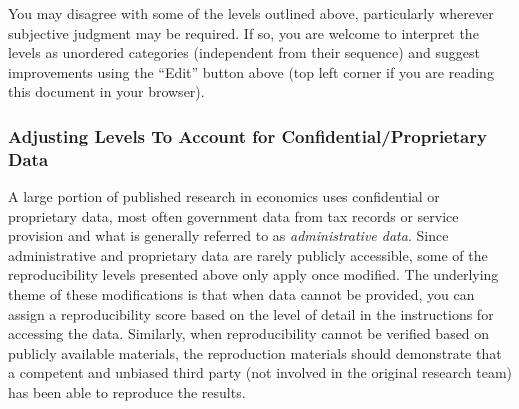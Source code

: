 \documentclass[]{book}
\begin{document}
You may disagree with some of the levels outlined above, particularly wherever subjective judgment may be required. If so, you are welcome to interpret the levels as unordered categories (independent from their sequence) and suggest improvements using the ``Edit'' button above (top left corner if you are reading this document in your browser).

\hypertarget{adjusting-levels-to-account-for-confidentialproprietary-data}{%
\subsubsection*{Adjusting Levels To Account for Confidential/Proprietary Data}\label{adjusting-levels-to-account-for-confidentialproprietary-data}}

A large portion of published research in economics uses confidential or proprietary data, most often government data from tax records or service provision and what is generally referred to as \emph{administrative data}. Since administrative and proprietary data are rarely publicly accessible, some of the reproducibility levels presented above only apply once modified. The underlying theme of these modifications is that when data cannot be provided, you can assign a reproducibility score based on the level of detail in the instructions for accessing the data. Similarly, when reproducibility cannot be verified based on publicly available materials, the reproduction materials should demonstrate that a competent and unbiased third party (not involved in the original research team) has been able to reproduce the results.
\end{document}
